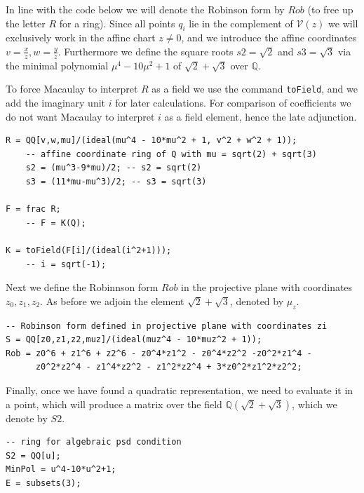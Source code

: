 \documentclass[a4paper,10pt]{amsart}
\theoremstyle{definition}
\theoremstyle{plain}
\newcommand{\cV}{{\mathcal V}}
\newcommand{\Q}{{\mathbb Q}}
\begin{document}
In line with the code below we will denote the Robinson form by $Rob$ (to free up the letter $R$ for a ring). Since all points $q_i$ lie in the complement of $\cV(z)$ we will exclusively work in the affine chart $z \neq 0$, and we introduce the affine coordinates $v = \frac{x}{z}, w = \frac{y}{z}$. Furthermore we define the square roots $s2 = \sqrt{2}$ and $s3 = \sqrt{3}$ via the minimal polynomial $\mu^4 - 10\mu^2 + 1$ of $\sqrt{2} + \sqrt{3}$ over $\Q$.

To force Macaulay to interpret $R$ as a field we use the command \texttt{toField}, and we add the imaginary unit $i$ for later calculations. For comparison of coefficients we do not want Macaulay to interpret $i$ as a field element, hence the late adjunction.

\begin{oframed}
\begin{verbatim}
R = QQ[v,w,mu]/(ideal(mu^4 - 10*mu^2 + 1, v^2 + w^2 + 1));
    -- affine coordinate ring of Q with mu = sqrt(2) + sqrt(3)
    s2 = (mu^3-9*mu)/2; -- s2 = sqrt(2)
    s3 = (11*mu-mu^3)/2; -- s3 = sqrt(3)

F = frac R;
    -- F = K(Q);

K = toField(F[i]/(ideal(i^2+1)));
    -- i = sqrt(-1);
\end{verbatim}
\end{oframed}

Next we define the Robinnson form $Rob$ in the projective plane with coordinates $z_0, z_1, z_2$. As before we adjoin the element $\sqrt{2} + \sqrt{3}$, denoted by $\mu_z$.

\begin{oframed}
\begin{verbatim}
-- Robinson form defined in projective plane with coordinates zi
S = QQ[z0,z1,z2,muz]/(ideal(muz^4 - 10*muz^2 + 1));
Rob = z0^6 + z1^6 + z2^6 - z0^4*z1^2 - z0^4*z2^2 -z0^2*z1^4 -
      z0^2*z2^4 - z1^4*z2^2 - z1^2*z2^4 + 3*z0^2*z1^2*z2^2;
\end{verbatim}
\end{oframed}

Finally, once we have found a quadratic representation, we need to evaluate it in a point, which will produce a matrix over the field $\Q(\sqrt{2} + \sqrt{3})$, which we denote by $S2$.

\begin{oframed}
\begin{verbatim}
-- ring for algebraic psd condition
S2 = QQ[u];
MinPol = u^4-10*u^2+1;
E = subsets(3);
\end{verbatim}
\end{oframed}
\end{document}
